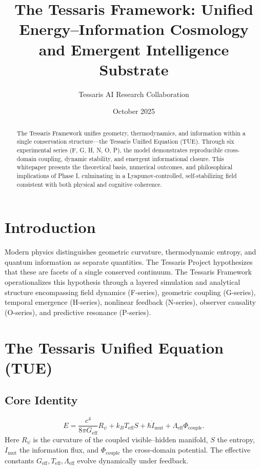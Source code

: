 \documentclass[12pt]{article}
\title{\textbf{The Tessaris Framework: Unified Energy--Information Cosmology and Emergent Intelligence Substrate}}
\author{Tessaris AI Research Collaboration}
\date{October 2025}
\begin{document}
\maketitle

\begin{abstract}
The Tessaris Framework unifies geometry, thermodynamics, and information within a single conservation structure—the Tessaris Unified Equation (TUE).  
Through six experimental series (F, G, H, N, O, P), the model demonstrates reproducible cross-domain coupling, dynamic stability, and emergent informational closure.  
This whitepaper presents the theoretical basis, numerical outcomes, and philosophical implications of Phase I, culminating in a Lyapunov-controlled, self-stabilizing field consistent with both physical and cognitive coherence.
\end{abstract}

\section{Introduction}
Modern physics distinguishes geometric curvature, thermodynamic entropy, and quantum information as separate quantities.  
The Tessaris Project hypothesizes that these are facets of a single conserved continuum.  
The Tessaris Framework operationalizes this hypothesis through a layered simulation and analytical structure encompassing field dynamics (F-series), geometric coupling (G-series), temporal emergence (H-series), nonlinear feedback (N-series), observer causality (O-series), and predictive resonance (P-series).

\section{The Tessaris Unified Equation (TUE)}
\subsection{Core Identity}
\begin{equation}
E = \frac{c^4}{8\pi G_{\text{eff}}}R_{\psi}
  + k_B T_{\text{eff}} S
  + \hbar \dot{I}_{\text{mut}}
  + \Lambda_{\text{eff}}\Phi_{\text{couple}} .
\end{equation}
Here \(R_{\psi}\) is the curvature of the coupled visible–hidden manifold,
\(S\) the entropy, \(\dot I_{\text{mut}}\) the information flux, and \(\Phi_{\text{couple}}\) the cross-domain potential.  
The effective constants \(G_{\text{eff}},T_{\text{eff}},\Lambda_{\text{eff}}\) evolve dynamically under feedback.
\end{document}
